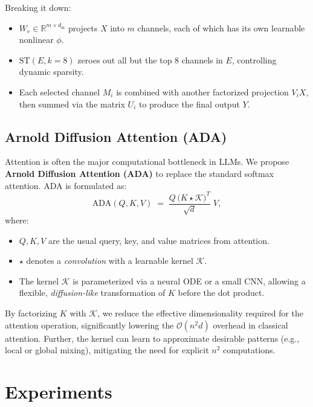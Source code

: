 \documentclass[twocolumn]{article}
\begin{document}
Breaking it down:
\begin{itemize}
    \item $W_e \in \mathbb{R}^{m \times d_{\mathrm{in}}}$ projects $X$ into $m$ channels, each of which has its own learnable nonlinear $\phi$.
    \item $\mathrm{ST}(E, k=8)$ zeroes out all but the top 8 channels in $E$, controlling dynamic sparsity.
    \item Each selected channel $M_i$ is combined with another factorized projection $V_i X$, then summed via the matrix $U_i$ to produce the final output $Y$.
\end{itemize}


\subsection{Arnold Diffusion Attention (ADA)}
Attention is often the major computational bottleneck in LLMs. We propose \textbf{Arnold Diffusion Attention (ADA)} to replace the standard softmax attention. ADA is formulated as:
\[
\mathrm{ADA}(Q, K, V) \;=\; \frac{Q \,\bigl(K \star \mathcal{K}\bigr)^T}{\sqrt{d}} \; V,
\]
where:
\begin{itemize}
    \item $Q, K, V$ are the usual query, key, and value matrices from attention.
    \item $\star$ denotes a \emph{convolution} with a learnable kernel $\mathcal{K}$.
    \item The kernel $\mathcal{K}$ is parameterized via a neural ODE or a small CNN, allowing a flexible, \emph{diffusion-like} transformation of $K$ before the dot product.
\end{itemize}

By factorizing $K$ with $\mathcal{K}$, we reduce the effective dimensionality required for the attention operation, significantly lowering the $\mathcal{O}(n^2 d)$ overhead in classical attention. Further, the kernel can learn to approximate desirable patterns (e.g., local or global mixing), mitigating the need for explicit $n^2$ computations.

\section{Experiments}
\end{document}
